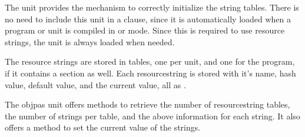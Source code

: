 {The  unit provides the mechanism to correctly initialize
the string tables. There is no need to include this unit in a 
clause, since it is automatically loaded when a program or unit is
compiled in  or  mode. Since this is required
to use resource strings, the unit is always loaded when needed.

The resource strings are stored in tables, one per unit, and one for the
program, if it contains a  section as well. Each
resourcestring is stored with it's name, hash value, default value, and
the current value, all as .

The objpas unit offers methods to retrieve the number of resourcestring
tables, the number of strings per table, and the above information for each
string. It also offers a method to set the current value of the strings.

}
